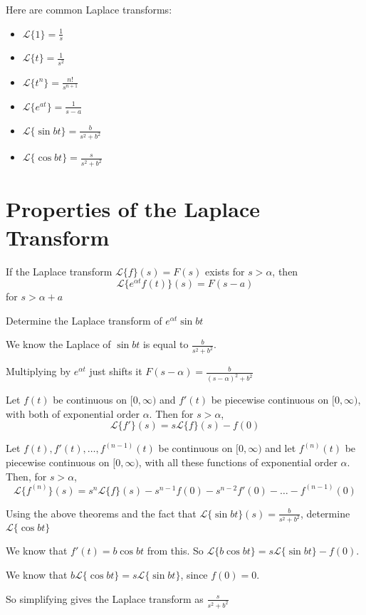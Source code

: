 \documentclass[../diffeq.tex]{subfiles}
\begin{document}
Here are common Laplace transforms:
\begin{itemize}
    \item $\mathcal{L}\{1\} = \frac{1}{s}$
    \item $\mathcal{L}\{t\} = \frac{1}{s^2}$
    \item $\mathcal{L}\{t^n\} = \frac{n!}{s^{n+1}}$
    \item $\mathcal{L}\{e^{at}\} = \frac{1}{s-a}$
    \item $\mathcal{L}\{\sin bt\} = \frac{b}{s^2+b^2}$
    \item $\mathcal{L}\{\cos bt\} = \frac{s}{s^2+b^2}$
\end{itemize}

\section{Properties of the Laplace Transform}
\begin{theorem}
    If the Laplace transform $\mathcal{L}\{f\}(s)=F(s)$ exists for $s>\alpha$, then 
    \[ \mathcal{L}\{e^{\alpha t}f(t)\}(s)=F(s-a) \]
    for $s>\alpha+a$
\end{theorem}

\begin{example}
    Determine the Laplace transform of $e^{\alpha t}\sin bt$

    We know the Laplace of $\sin bt$ is equal to $\frac{b}{s^2+b^2}$.

    Multiplying by $e^{\alpha t}$ just shifts it $F(s-\alpha)=\frac{b}{(s-\alpha)^2+b^2}$
\end{example}

\begin{theorem}
    Let $f(t)$ be continuous on $[0,\infty)$ and $f'(t)$ be piecewise continuous on $[0,\infty)$, with both of exponential order $\alpha$. Then for $s>\alpha$,
    \[\mathcal{L}\{f'\}(s)=s\mathcal{L}\{f\}(s)-f(0) \]
\end{theorem}

\begin{theorem}
    Let $f(t),f'(t),\dots,f^{(n-1)}(t)$ be continuous on $[0,\infty)$ and let $f^{(n)}(t)$ be piecewise continuous on $[0,\infty)$, with all these functions of exponential order $\alpha$.
    Then, for $s>\alpha$,
    \[ \mathcal{L}\{f^{(n)}\}(s)=s^n\mathcal{L}\{f\}(s)-s^{n-1}f(0)-s^{n-2}f'(0)-\dots-f^{(n-1)}(0) \]
\end{theorem}

\begin{example}
    Using the above theorems and the fact that $\mathcal{L}\{\sin bt\}(s)=\frac{b}{s^2+b^2}$, determine $\mathcal{L}\{\cos bt\}$

    We know that $f'(t)=b\cos bt$ from this. So $\mathcal{L}\{b\cos bt\}=s\mathcal{L}\{\sin bt\}-f(0)$.

    We know that $b\mathcal{L}\{\cos bt\}=s\mathcal{L}\{\sin bt\}$, since $f(0)=0$.

    So simplifying gives the Laplace transform as $\frac{s}{s^2+b^2}$
\end{example}
\end{document}
